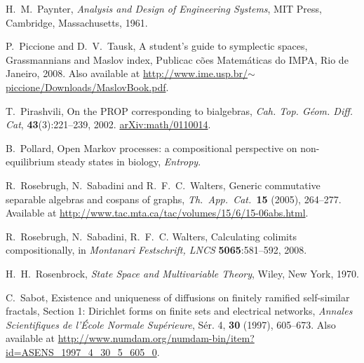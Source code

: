 \begin{thebibliography}{RSW00}
     H.\ M.\ Paynter, {\sl Analysis and Design of Engineering
    Systems}, MIT Press, Cambridge, Massachusetts, 1961.


     P.\ Piccione and D.\ V.\ Tausk, A student's guide to symplectic
    spaces, Grassmannians and Maslov index, Publicac c\~oes Matem\'aticas do
    IMPA, Rio de Janeiro, 2008. Also available at
    \href{http://www.ime.usp.br/~piccione/Downloads/MaslovBook.pdf}
    {http://www.ime.usp.br/$\sim$piccione/Downloads/MaslovBook.pdf}.

     T.\ Pirashvili, On the PROP corresponding to bialgebras,
    \emph{Cah. Top. G\'{e}om. Diff. Cat}, {\bf 43}(3):221--239, 2002.
    \href{http://arxiv.org/abs/math/0110014}{arXiv:math/0110014}.

     B.\ Pollard, Open Markov processes: a compositional
    perspective on non-equilibrium steady states in biology, {\sl Entropy}.

     R.\ Rosebrugh, N.\ Sabadini and R.\ F.\ C.\ Walters, Generic
    commutative separable algebras and cospans of graphs, \textsl{Th.\ App.\
    Cat.\ }\textbf{15} (2005), 264--277. Available at
    \href{http://www.tac.mta.ca/tac/volumes/15/6/15-06abs.html}{http://www.tac.mta.ca/tac/volumes/15/6/15-06abs.html}.

     R.\ Rosebrugh, N.\ Sabadini, R.\ F.\ C. Walters, Calculating
    colimits compositionally, in \emph{Montanari Festschrift, LNCS} {\bf 5065}:581--592,
    2008.

     H.\ H.\ Rosenbrock, \emph{State Space and Multivariable Theory},
    Wiley, New York, 1970. 


     C.\ Sabot, Existence and uniqueness of diffusions on
    finitely ramified self-similar fractals, Section 1: Dirichlet forms on
    finite sets and electrical networks, {\sl Annales Scientifiques de l'\'Ecole
    Normale Sup\'erieure}, S\'er. 4, {\bf 30} (1997), 605--673. Also available at
    \href{http://www.numdam.org/numdam-bin/item?id=ASENS_1997_4_30_5_605_0}{http://www.numdam.org/numdam-bin/item?id=ASENS\_1997\_4\_30\_5\_605\_0}.


\end{thebibliography}
